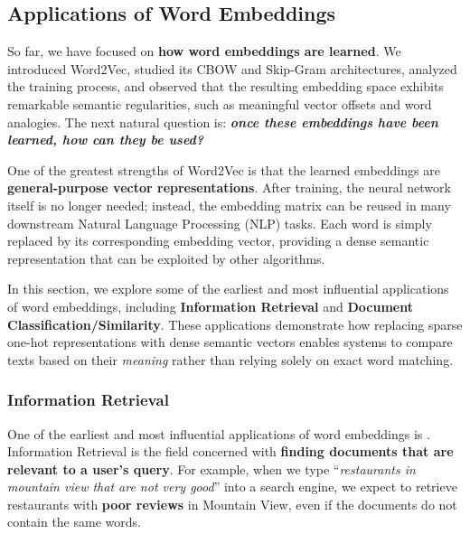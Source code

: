 \subsection{Applications of Word Embeddings}\label{sec:applications-of-word-embeddings}

So far, we have focused on \textbf{how word embeddings are learned}. We introduced Word2Vec, studied its CBOW and Skip-Gram architectures, analyzed the training process, and observed that the resulting embedding space exhibits remarkable semantic regularities, such as meaningful vector offsets and word analogies. The next natural question is: \emph{\textbf{once these embeddings have been learned, how can they be used?}}

\highspace
One of the greatest strengths of Word2Vec is that the learned embeddings are \textbf{general-purpose vector representations}. After training, the neural network itself is no longer needed; instead, the embedding matrix can be reused in many downstream Natural Language Processing (NLP) tasks. Each word is simply replaced by its corresponding embedding vector, providing a dense semantic representation that can be exploited by other algorithms.

\highspace
In this section, we explore some of the earliest and most influential applications of word embeddings, including \textbf{Information Retrieval} and \textbf{Document Classification/Similarity}. These applications demonstrate how replacing sparse one-hot representations with dense semantic vectors enables systems to compare texts based on their \emph{meaning} rather than relying solely on exact word matching.

\longline

\subsubsection{Information Retrieval}\label{sec:information-retrieval}

One of the earliest and most influential applications of word embeddings is . Information Retrieval is the field concerned with \textbf{finding documents that are relevant to a user's query}. For example, when we type ``\emph{restaurants in mountain view that are not very good}'' into a search engine, we expect to retrieve restaurants with \textbf{poor reviews} in Mountain View, even if the documents do not contain the same words.

